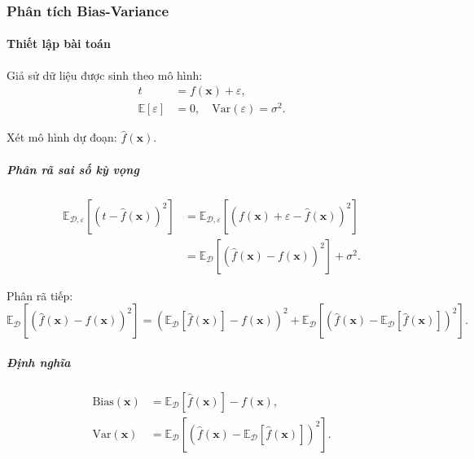 \subsubsection{Phân tích Bias-Variance}
\paragraph{Thiết lập bài toán}

Giả sử dữ liệu được sinh theo mô hình:
\begin{align}
    t &= f(\mathbf{x}) + \varepsilon, \\
    \mathbb{E}[\varepsilon] &= 0, \quad \mathrm{Var}(\varepsilon) = \sigma^2.
\end{align}

Xét mô hình dự đoạn: $\hat{f}(\mathbf{x})$.

\subparagraph{Phân rã sai số kỳ vọng}

\begin{align}
    \mathbb{E}_{\mathcal{D}, \varepsilon}
    \left[
        \left(t - \hat{f}(\mathbf{x}) \right)^2
    \right]
    &= \mathbb{E}_{\mathcal{D}, \varepsilon}
    \left[
        \left(f(\mathbf{x}) + \varepsilon - \hat{f}(\mathbf{x}) \right)^2
    \right] \\
    &= \mathbb{E}_{\mathcal{D}}
    \left[
        \left(\hat{f}(\mathbf{x}) - f(\mathbf{x}) \right)^2
    \right] + \sigma^2.
\end{align}

Phân rã tiếp:
\begin{equation}
    \mathbb{E}_{\mathcal{D}}
    \left[
        \left(\hat{f}(\mathbf{x}) - f(\mathbf{x}) \right)^2
    \right]
    = \left(
        \mathbb{E}_{\mathcal{D}}[\hat{f}(\mathbf{x})]
        - f(\mathbf{x})
    \right)^2 + \mathbb{E}_{\mathcal{D}}
    \left[
        \left(
            \hat{f}(\mathbf{x}) -
            \mathbb{E}_{\mathcal{D}}[\hat{f}(\mathbf{x})]
        \right)^2
    \right].
\end{equation}

\subparagraph{Định nghĩa}

\begin{align}
    \mathrm{Bias}(\mathbf{x})
    &= \mathbb{E}_{\mathcal{D}}[\hat{f}(\mathbf{x})] - f(\mathbf{x}), \\
    \mathrm{Var}(\mathbf{x})
    &= \mathbb{E}_{\mathcal{D}}
    \left[
        \left(
            \hat{f}(\mathbf{x}) -
            \mathbb{E}_{\mathcal{D}}[\hat{f}(\mathbf{x})]
        \right)^2
    \right].
\end{align}


